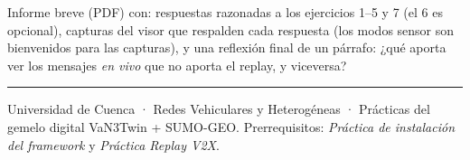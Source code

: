 \documentclass[11pt,a4paper]{article}
\begin{document}
Informe breve (PDF) con: respuestas razonadas a los ejercicios 1--5 y 7
(el 6 es opcional), capturas del visor que respalden cada respuesta
(los modos sensor son bienvenidos para las capturas), y una reflexión final de
un párrafo: ¿qué aporta ver los mensajes \emph{en vivo} que no aporta el
replay, y viceversa?

\vspace{8pt}\hrule\vspace{6pt}
{\small\color{gris} Universidad de Cuenca · Redes Vehiculares y Heterogéneas ·
Prácticas del gemelo digital VaN3Twin + SUMO-GEO. Prerrequisitos:
\emph{Práctica de instalación del framework} y \emph{Práctica Replay V2X}.}
\end{document}

